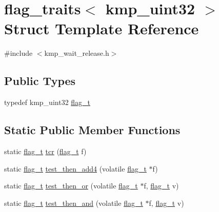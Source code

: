 \hypertarget{structflag__traits_3_01kmp__uint32_01_4}{\section{flag\-\_\-traits$<$ kmp\-\_\-uint32 $>$ Struct Template Reference}
\label{structflag__traits_3_01kmp__uint32_01_4}
}


{\ttfamily \#include $<$kmp\-\_\-wait\-\_\-release.\-h$>$}

\subsection*{Public Types}
\begin{DoxyCompactItemize}
\item 
typedef kmp\-\_\-uint32 \hyperlink{structflag__traits_3_01kmp__uint32_01_4_a216e25725dfeeee57bb3367f0bffb763}{flag\-\_\-t}
\end{DoxyCompactItemize}
\subsection*{Static Public Member Functions}
\begin{DoxyCompactItemize}
\item 
static \hyperlink{structflag__traits_3_01kmp__uint32_01_4_a216e25725dfeeee57bb3367f0bffb763}{flag\-\_\-t} \hyperlink{structflag__traits_3_01kmp__uint32_01_4_a107e5d82439c7a50b70c28bcd80b3904}{tcr} (\hyperlink{structflag__traits_3_01kmp__uint32_01_4_a216e25725dfeeee57bb3367f0bffb763}{flag\-\_\-t} f)
\item 
static \hyperlink{structflag__traits_3_01kmp__uint32_01_4_a216e25725dfeeee57bb3367f0bffb763}{flag\-\_\-t} \hyperlink{structflag__traits_3_01kmp__uint32_01_4_a7a9f86d9e939f8e571fb708a69f2d1ac}{test\-\_\-then\-\_\-add4} (volatile \hyperlink{structflag__traits_3_01kmp__uint32_01_4_a216e25725dfeeee57bb3367f0bffb763}{flag\-\_\-t} $\ast$f)
\item 
static \hyperlink{structflag__traits_3_01kmp__uint32_01_4_a216e25725dfeeee57bb3367f0bffb763}{flag\-\_\-t} \hyperlink{structflag__traits_3_01kmp__uint32_01_4_ad4ccdffe86b008815a205607a8b8cb20}{test\-\_\-then\-\_\-or} (volatile \hyperlink{structflag__traits_3_01kmp__uint32_01_4_a216e25725dfeeee57bb3367f0bffb763}{flag\-\_\-t} $\ast$f, \hyperlink{structflag__traits_3_01kmp__uint32_01_4_a216e25725dfeeee57bb3367f0bffb763}{flag\-\_\-t} v)
\item 
static \hyperlink{structflag__traits_3_01kmp__uint32_01_4_a216e25725dfeeee57bb3367f0bffb763}{flag\-\_\-t} \hyperlink{structflag__traits_3_01kmp__uint32_01_4_aec09b9100f7c8e56f5bf21fb9266776b}{test\-\_\-then\-\_\-and} (volatile \hyperlink{structflag__traits_3_01kmp__uint32_01_4_a216e25725dfeeee57bb3367f0bffb763}{flag\-\_\-t} $\ast$f, \hyperlink{structflag__traits_3_01kmp__uint32_01_4_a216e25725dfeeee57bb3367f0bffb763}{flag\-\_\-t} v)
\end{DoxyCompactItemize}

